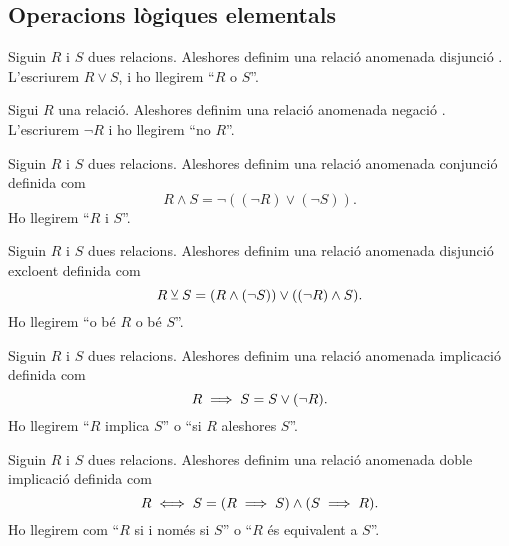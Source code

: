 \documentclass[../Apunts.tex]{subfiles}
\begin{document}
	\subsection{Operacions lògiques elementals}
	\begin{definition}[Disjunció]
		\label{def:disjunció}
		Siguin \(R\) i \(S\) dues relacions. Aleshores definim una relació anomenada disjunció%
		. L'escriurem \(R\lor S\), i ho llegirem ``\(R\) o \(S\)''.
	\end{definition}
	\begin{definition}[Negació]
		\label{def:negació}
		Sigui \(R\) una relació. Aleshores definim una relació anomenada negació%
		. L'escriurem \(\lnot R\) i ho llegirem ``no \(R\)''.
	\end{definition}
	\begin{definition}[Conjunció]
		\label{def:conjunció}
		Siguin \(R\) i \(S\) dues relacions. Aleshores definim una relació anomenada conjunció definida com
		\[R\land S=\lnot((\lnot R)\lor(\lnot S)).\]
		Ho llegirem ``\(R\) i \(S\)''.
	\end{definition}
	\begin{definition}
		\label{def:disjunció excloent}
		Siguin \(R\) i \(S\) dues relacions. Aleshores definim una relació anomenada disjunció excloent definida com
		\[R\veebar S=(R\land(\lnot S))\lor((\lnot R)\land S).\]
		Ho llegirem ``o bé \(R\) o bé \(S\)''.
	\end{definition}
	\begin{definition}[Implicació]
		\label{def:implicació}
		Siguin \(R\) i \(S\) dues relacions. Aleshores definim una relació anomenada implicació definida com
		\[R\implies S=S\lor(\lnot R).\]
		Ho llegirem ``\(R\) implica \(S\)'' o ``si \(R\) aleshores \(S\)''.
	\end{definition}
	\begin{definition}
		\label{def:doble implicació}
		Siguin \(R\) i \(S\) dues relacions. Aleshores definim una relació anomenada doble implicació definida com
		\[R\iff S=(R\implies S)\land(S\implies R).\]
		Ho llegirem com ``\(R\) si i només si \(S\)'' o ``\(R\) és equivalent a \(S\)''.
	\end{definition}
\end{document}
